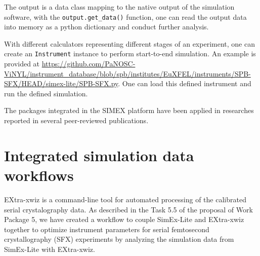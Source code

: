 \documentclass[11pt, a4paper]{article}
\begin{document}
The output is a data class mapping to the native output of the simulation software, with the \verb|output.get_data()| function, one can read the output data into memory as a python dictionary and conduct further analysis.

With different calculators representing different stages of an experiment, one can create an \verb|Instrument| instance to perform start-to-end simulation. An example is provided at
\url{https://github.com/PaNOSC-ViNYL/instrument_database/blob/spb/institutes/EuXFEL/instruments/SPB-SFX/HEAD/simex-lite/SPB-SFX.py}. One can load this defined instrument and run the defined simulation.

The packages integrated in the SIMEX platform have been applied in researches reported in several peer-reviewed publications\cite{fortmann-grote2017iucrj,e2021,e2022}.




\section{Integrated simulation data workflows\label{sec:simdata}}
EXtra-xwiz is a command-line tool for automated processing of the calibrated serial crystalography data\cite{xwiz}. As described in the Task 5.5 of the proposal of Work Package 5, we have created a workflow to couple SimEx-Lite and EXtra-xwiz together to optimize instrument parameters for serial femtosecond crystallography (SFX) experiments by analyzing the simulation data from SimEx-Lite with EXtra-xwiz. 
\end{document}
